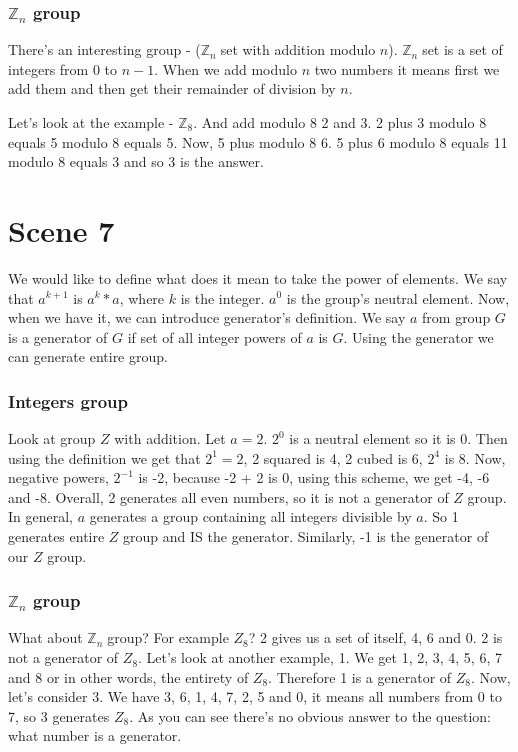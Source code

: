 \documentclass[12pt]{article}
\newcommand{\zn}{$\mathbb{Z}_n\;$}
\newcommand{\mybox}[1]{\colorbox{Goldenrod2}{#1}}
\newcommand{\myboxx}[1]{\colorbox{SkyBlue2}{#1}}
\begin{document}
    \subsubsection*{\myboxx{$\mathbb{Z}_n$ group}}
    There's an interesting group - (\zn set with addition modulo $n$). \zn set is a set of integers from 0 to $n-1$. When we add modulo $n$ two numbers it means first we add them and then get their remainder of division by $n$.

    Let's look at the example - $\mathbb{Z}_8$. And add modulo 8 2 and 3. 2 plus 3 modulo 8 equals 5 modulo 8 equals 5. Now, 5 plus modulo 8 6. 5 plus 6 modulo 8 equals 11 modulo 8 equals 3 and so 3 is the answer.


\section*{\mybox{Scene 7}}
    We would like to define what does it mean to take the power of elements. We say that $a^{k+1}$ is $a^k \ast a$, where $k$ is the integer. $a^0$ is the group's neutral element. Now, when we have it, we can introduce generator's definition. We say $a$ from group $G$ is a generator of $G$ if set of all integer powers of $a$ is $G$. Using the generator we can generate entire group.

    \subsubsection*{\myboxx{Integers group}}
    Look at group $Z$ with addition. Let $a=2$. $2^0$ is a neutral element so it is 0. Then using the definition we get that $2^1=2$, 2 squared is 4, 2 cubed is 6, $2^4$ is 8. Now, negative powers, $2^{-1}$ is -2, because -2 + 2 is 0, using this scheme, we get -4, -6 and -8. Overall, 2 generates all even numbers, so it is not a generator of $Z$ group. In general, $a$ generates a group containing all integers divisible by $a$. So 1 generates entire $Z$ group and IS the generator. Similarly, -1 is the generator of our $Z$ group.

    \subsubsection*{\myboxx{$\mathbb{Z}_n$ group}}
    What about \zn group? For example $Z_8$? 2 gives us a set of itself, 4, 6 and 0. 2 is not a generator of $Z_8$. Let's look at another example, 1. We get 1, 2, 3, 4, 5, 6, 7 and 8 or in other words, the entirety of $Z_8$. Therefore 1 is a generator of $Z_8$. Now, let's consider 3. We have 3, 6, 1, 4, 7, 2, 5 and 0, it means all numbers from 0 to 7, so 3 generates $Z_8$. As you can see there's no obvious answer to the question: what number is a generator.
\end{document}

